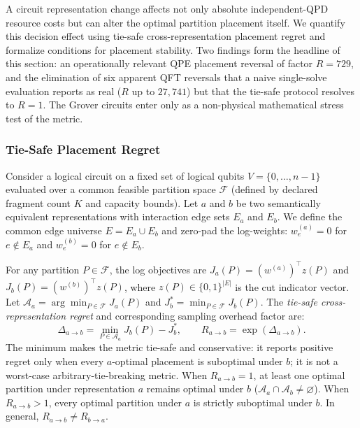 \documentclass[11pt]{article}
\begin{document}
A circuit representation change affects not only absolute independent-QPD resource costs but can alter the optimal partition placement itself. We quantify this decision effect using tie-safe cross-representation placement regret and formalize conditions for placement stability. Two findings form the headline of this section: an operationally relevant QPE placement reversal of factor $R=729$, and the elimination of six apparent QFT reversals that a naive single-solve evaluation reports as real ($R$ up to $27{,}741$) but that the tie-safe protocol resolves to $R=1$. The Grover circuits enter only as a non-physical mathematical stress test of the metric.

\subsubsection{Tie-Safe Placement Regret}
Consider a logical circuit on a fixed set of logical qubits $V=\{0,\ldots,n{-}1\}$ evaluated over a common feasible partition space $\mathcal{F}$ (defined by declared fragment count $K$ and capacity bounds). Let $a$ and $b$ be two semantically equivalent representations with interaction edge sets $E_a$ and $E_b$. We define the common edge universe $E = E_a \cup E_b$ and zero-pad the log-weights: $w^{(a)}_e = 0$ for $e \notin E_a$ and $w^{(b)}_e = 0$ for $e \notin E_b$.

For any partition $P \in \mathcal{F}$, the log objectives are $J_a(P)=(w^{(a)})^\top z(P)$ and $J_b(P)=(w^{(b)})^\top z(P)$, where $z(P)\in\{0,1\}^{|E|}$ is the cut indicator vector. Let $\mathcal{A}_a = \arg\min_{P\in\mathcal{F}} J_a(P)$ and $J_b^* = \min_{P\in\mathcal{F}} J_b(P)$. The \emph{tie-safe cross-representation regret} and corresponding sampling overhead factor are:
\begin{equation}
  \Delta_{a\to b} = \min_{P \in \mathcal{A}_a} J_b(P) - J_b^*, \qquad R_{a\to b} = \exp(\Delta_{a\to b}).
  \label{eq:regret}
\end{equation}
The minimum makes the metric tie-safe and conservative: it reports positive regret only when every $a$-optimal placement is suboptimal under $b$; it is not a worst-case arbitrary-tie-breaking metric. When $R_{a\to b}=1$, at least one optimal partition under representation $a$ remains optimal under $b$ ($\mathcal{A}_a \cap \mathcal{A}_b \neq \varnothing$). When $R_{a\to b} > 1$, every optimal partition under $a$ is strictly suboptimal under $b$. In general, $R_{a\to b} \neq R_{b\to a}$.
\end{document}
